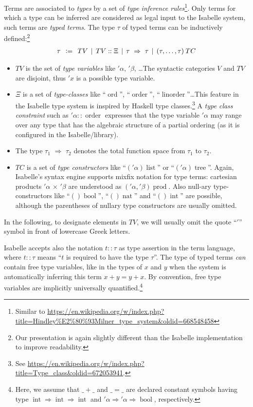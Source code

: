 Terms are associated to \emph{types} by a set of \emph{type
  inference rules}\footnote{Similar to
\url{https://en.wikipedia.org/w/index.php?title=Hindley\%E2\%80\%93Milner_type_system&oldid=668548458}}. Only
terms for which a type can be inferred are considered as legal input
to the Isabelle system, such terms are \emph{typed terms}. The type
$\tau$ of typed terms can be inductively defined:\footnote{Our
  presentation is again slightly different than the Isabelle
  implementation to improve readability.}
\begin{gather*}
\tau \:\: \mathrel{\mathop:}= \:\: TV \:\:|\:\: TV :: \Xi \:\:|\:\: \tau~\Rightarrow~\tau \:\:|\:\: (\tau, \ldots, \tau)\: TC
\end{gather*}
\begin{itemize}
\item $TV$ is the set of \emph{type variables} like $'\alpha$,
  $'\beta$, \ldots The syntactic categories $V$ and $TV$ are disjoint,
  thus $'x$ is a possible type variable.
\item $\Xi$ is a set of
  \emph{type-classes} like
  ``$\operatorname{ord}$'', ``$\operatorname{order}$'',
  ``$\operatorname{linorder}$''\ldots This feature in the Isabelle
  type system is inspired by Haskell type classes.\footnote{See \url{https://en.wikipedia.org/w/index.php?title=Type_class&oldid=672053941}.}  A \emph{type class
    constraint} such as $'\alpha::\operatorname{order}$ expresses that
  the type variable $'\alpha$ may range over any type that has the
  algebraic structure of a partial ordering (as it is configured in
  the Isabelle/\HOL library).
\item The type $\tau_1$ $\Rightarrow$ $\tau_2$ denotes the total
  function space from $\tau_1$ to $\tau_2$.
\item $TC$ is a set of \emph{type constructors} like
  ``$('\alpha)\operatorname{list}$'' or
  ``$('\alpha)\operatorname{tree}$''. Again, Isabelle's syntax engine
  supports mixfix notation for type terms: \eg cartesian products
  $'\alpha$ $\times$ $'\beta$ are understood as $('\alpha,'\beta)
  \operatorname{prod}$. Also null-ary type-constructors like
  ``$()\operatorname{bool}$'', ``$()\operatorname{nat}$'' and
  ``$()\operatorname{int}$'' are possible, although the parentheses of
  nullary type constructors are usually omitted.
\end{itemize}
In the following, to designate elements in $TV$, we will usually omit
the quote ``$'$'' symbol in front of lowercase Greek letters.

Isabelle accepts also the notation $t :: \tau$ as type assertion in
the term language, where $t :: \tau$ means ``$t$ is required to have
the type $\tau$''. The type of typed terms \emph{can} contain free
type variables, like in the types of $x$ and $y$ when the system is
automatically inferring this term $x + y = y + x$. By convention, free
type variables are implicitly universally quantified.\footnote{Here, we assume that $\_ + \_$ and $\_ = \_$ are
  declared constant symbols having type
  $\operatorname{int} \Rightarrow \operatorname{int} \Rightarrow
  \operatorname{int}$
  and $'\alpha \Rightarrow '\alpha \Rightarrow \operatorname{bool}$,
  respectively.}

